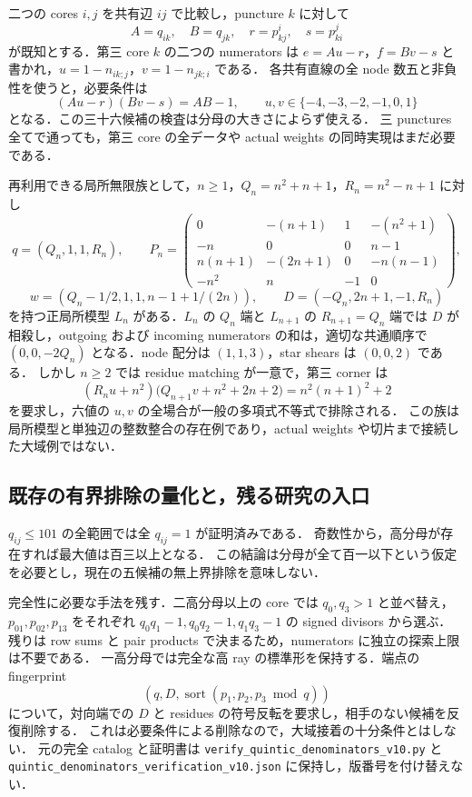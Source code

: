 二つの cores $i,j$ を共有辺 $ij$ で比較し，puncture $k$ に対して
\[
 A=q_{ik},\quad B=q_{jk},\quad r=p^i_{kj},\quad s=p^j_{ki}
\]
が既知とする．第三 core $k$ の二つの numerators は
$e=Au-r$，$f=Bv-s$ と書かれ，$u=1-n_{ik;j}$，$v=1-n_{jk;i}$ である．
各共有直線の全 node 数五と非負性を使うと，必要条件は
\[
 (Au-r)(Bv-s)=AB-1,
 \qquad u,v\in\{-4,-3,-2,-1,0,1\}
\]
となる．この三十六候補の検査は分母の大きさによらず使える．
三 punctures 全てで通っても，第三 core の全データや actual weights の同時実現はまだ必要である．

再利用できる局所無限族として，$n\geq1$，$Q_n=n^2+n+1$，$R_n=n^2-n+1$ に対し
\[
 q=(Q_n,1,1,R_n),\qquad
 P_n=\begin{pmatrix}
 0&-(n+1)&1&-(n^2+1)\\
 -n&0&0&n-1\\
 n(n+1)&-(2n+1)&0&-n(n-1)\\
 -n^2&n&-1&0
 \end{pmatrix},
\]
\[
 w=(Q_n-1/2,1,1,n-1+1/(2n)),\qquad
 D=(-Q_n,2n+1,-1,R_n)
\]
を持つ正局所模型 $L_n$ がある．$L_n$ の $Q_n$ 端と $L_{n+1}$ の $R_{n+1}=Q_n$ 端では
$D$ が相殺し，outgoing および incoming numerators の和は，適切な共通順序で
$(0,0,-2Q_n)$ となる．node 配分は $(1,1,3)$，star shears は $(0,0,2)$ である．
しかし $n\geq2$ では residue matching が一意で，第三 corner は
\[
 (R_nu+n^2)\bigl(Q_{n+1}v+n^2+2n+2\bigr)
   =n^2(n+1)^2+2
\]
を要求し，六値の $u,v$ の全場合が一般の多項式不等式で排除される．
この族は局所模型と単独辺の整数整合の存在例であり，actual weights や切片まで接続した大域例ではない．

\subsection{既存の有界排除の量化と，残る研究の入口}

$q_{ij}\le101$ の全範囲では全 $q_{ij}=1$ が証明済みである．
奇数性から，高分母が存在すれば最大値は百三以上となる．
この結論は分母が全て百一以下という仮定を必要とし，現在の五候補の無上界排除を意味しない．

完全性に必要な手法を残す．二高分母以上の core では $q_0,q_3>1$ と並べ替え，
$p_{01},p_{02},p_{13}$ をそれぞれ $q_0q_1-1,q_0q_2-1,q_1q_3-1$ の signed divisors から選ぶ．
残りは row sums と pair products で決まるため，numerators に独立の探索上限は不要である．
一高分母では完全な高 ray の標準形を保持する．端点の fingerprint
\[
 \left(q,D,\operatorname{sort}(p_1,p_2,p_3\bmod q)\right)
\]
について，対向端での $D$ と residues の符号反転を要求し，相手のない候補を反復削除する．
これは必要条件による削除なので，大域接着の十分条件とはしない．
元の完全 catalog と証明書は
\nolinkurl{verify_quintic_denominators_v10.py} と
\nolinkurl{quintic_denominators_verification_v10.json} に保持し，版番号を付け替えない．

